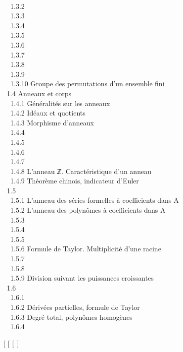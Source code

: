\\ ~~1.3.2  \\ ~~1.3.3
 \\
~~1.3.4  \\
~~1.3.5  \\ ~~1.3.6
 \\ ~~1.3.7
 \\ ~~1.3.8
 \\ ~~1.3.9
 \\
~~1.3.10 {Groupe des permutations
d'un ensemble fini} \\ ~1.4 {Anneaux et
corps} \\ ~~1.4.1 {Généralités sur
les anneaux} \\ ~~1.4.2 {Idéaux et
quotients} \\ ~~1.4.3 {Morphisme
d'anneaux} \\ ~~1.4.4  \\
~~1.4.5  \\ ~~1.4.6
 \\
~~1.4.7  \\
~~1.4.8 {L'anneau ℤ. Caractéristique
d'un anneau} \\ ~~1.4.9 {Théorème
chinois, indicateur d'Euler} \\ ~1.5
 \\ ~~1.5.1
{L'anneau des séries formelles à
coefficients dans A} \\ ~~1.5.2
{L'anneau des polynômes à
coefficients dans A} \\ ~~1.5.3
 \\
~~1.5.4  \\ ~~1.5.5
 \\
~~1.5.6 {Formule de Taylor.
Multiplicité d'une racine} \\ ~~1.5.7
 \\
~~1.5.8  \\
~~1.5.9 {Division suivant les
puissances croissantes} \\ ~1.6
 \\
~~1.6.1  \\ ~~1.6.2
{Dérivées partielles, formule de
Taylor} \\ ~~1.6.3 {Degré total,
polynômes homogènes} \\ ~~1.6.4


{[}
{[}
{[}
{[}

